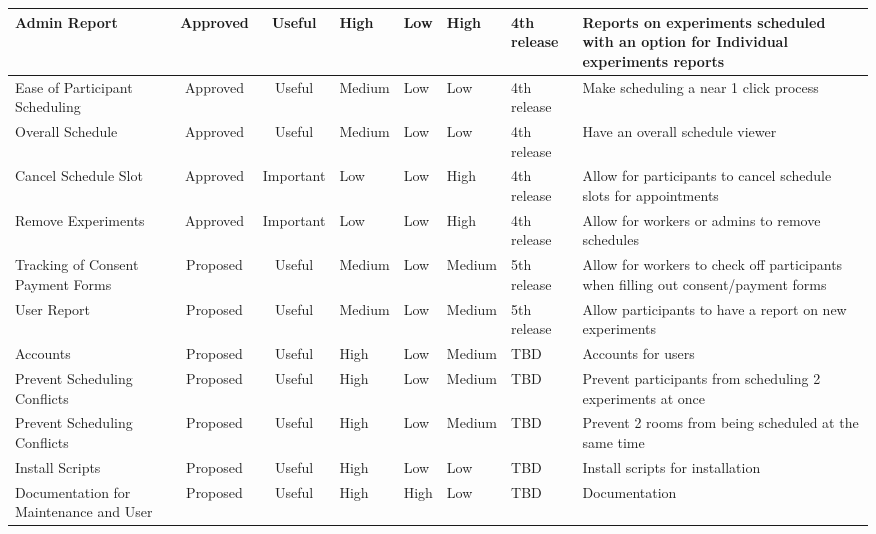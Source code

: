 \documentclass[11pt]{article}
\begin{document}
\begin{table}
\begin{tabular}{| p{2.5cm} | c | c | p{1.25cm} | p{1.5cm} | p{1.5cm} | p{1.25cm} | p{3.25cm}|}
    \hline
    Admin Report & Approved & Useful & High  & Low   & High  & 4th release  & Reports on experiments scheduled with an option for Individual experiments reports \\
    \hline
    Ease of Participant Scheduling & Approved & Useful & Medium & Low   & Low   & 4th release  & Make scheduling a near 1 click process \\
    \hline
    Overall Schedule & Approved & Useful & Medium & Low   & Low   & 4th release  & Have an overall schedule viewer \\
    \hline
    Cancel Schedule Slot & Approved & Important & Low   & Low   & High  & 4th release  & Allow for participants to cancel schedule slots for appointments \\
    \hline
    Remove Experiments & Approved & Important & Low   & Low   & High  & 4th release  & Allow for workers or admins to remove schedules \\
    \hline
    Tracking of Consent Payment Forms & Proposed & Useful & Medium & Low   & Medium & 5th release  & Allow for workers to check off participants when filling out consent/payment forms \\
    \hline
    User Report & Proposed & Useful & Medium & Low   & Medium & 5th release & Allow participants to have a report on new experiments \\
    \hline
    Accounts & Proposed & Useful & High  & Low   & Medium & TBD & Accounts for users \\
    \hline
    Prevent Scheduling Conflicts & Proposed & Useful & High  & Low   & Medium & TBD & Prevent participants from scheduling 2 experiments at once \\
    \hline
    Prevent Scheduling Conflicts & Proposed & Useful & High  & Low   & Medium & TBD  & Prevent 2 rooms from being scheduled at the same time \\
    \hline
    Install Scripts & Proposed & Useful & High  & Low   & Low   & TBD & Install scripts for installation \\
    \hline
    Documentation for Maintenance and User & Proposed & Useful & High  & High  & Low   & TBD  & Documentation \\
    \hline
    \end{tabular}%
\end{table}%

\newpage


	\addtolength{\textwidth}{1.75in}
\end{document}
